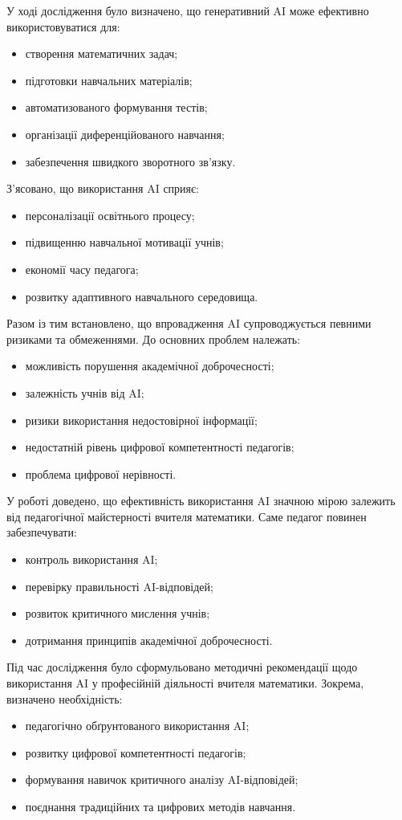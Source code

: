 У ході дослідження було визначено, що генеративний AI може ефективно використовуватися для:
\begin{itemize}
\item створення математичних задач;
\item підготовки навчальних матеріалів;
\item автоматизованого формування тестів;
\item організації диференційованого навчання;
\item забезпечення швидкого зворотного зв’язку.
\end{itemize}

З’ясовано, що використання AI сприяє:
\begin{itemize}
\item персоналізації освітнього процесу;
\item підвищенню навчальної мотивації учнів;
\item економії часу педагога;
\item розвитку адаптивного навчального середовища.
\end{itemize}

Разом із тим встановлено, що впровадження AI супроводжується певними ризиками та обмеженнями. До основних проблем належать:
\begin{itemize}
\item можливість порушення академічної доброчесності;
\item залежність учнів від AI;
\item ризики використання недостовірної інформації;
\item недостатній рівень цифрової компетентності педагогів;
\item проблема цифрової нерівності.
\end{itemize}

У роботі доведено, що ефективність використання AI значною мірою залежить від педагогічної майстерності вчителя математики. Саме педагог повинен забезпечувати:
\begin{itemize}
\item контроль використання AI;
\item перевірку правильності AI-відповідей;
\item розвиток критичного мислення учнів;
\item дотримання принципів академічної доброчесності.
\end{itemize}

Під час дослідження було сформульовано методичні рекомендації щодо використання AI у професійній діяльності вчителя математики. Зокрема, визначено необхідність:
\begin{itemize}
\item педагогічно обґрунтованого використання AI;
\item розвитку цифрової компетентності педагогів;
\item формування навичок критичного аналізу AI-відповідей;
\item поєднання традиційних та цифрових методів навчання.
\end{itemize}

